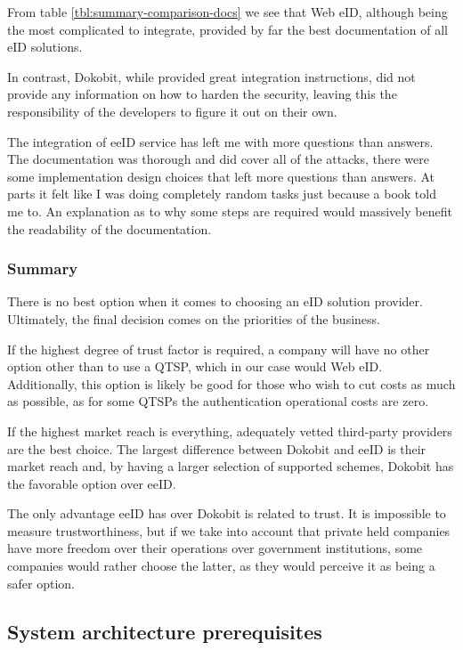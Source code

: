 From table \ref{tbl:summary-comparison-docs} we see that Web eID, although being the most complicated to integrate, provided by far the best documentation of all eID solutions.

In contrast, Dokobit, while provided great integration instructions, did not provide any information on how to harden the security, leaving this the responsibility of the developers to figure it out on their own.

The integration of eeID service has left me with more questions than answers. The documentation was thorough and did cover all of the attacks, there were some implementation design choices that left more questions than answers. At parts it felt like I was doing completely random tasks just because a book told me to. An explanation as to why some steps are required would massively benefit the readability of the documentation.

\subsubsection{Summary}

There is no best option when it comes to choosing an eID solution provider. Ultimately, the final decision comes on the priorities of the business.

If the highest degree of trust factor is required, a company will have no other option other than to use a QTSP, which in our case would Web eID. Additionally, this option is likely be good for those who wish to cut costs as much as possible, as for some QTSPs the authentication operational costs are zero.

If the highest market reach is everything, adequately vetted third-party providers are the best choice. The largest difference between Dokobit and eeID is their market reach and, by having a larger selection of supported schemes, Dokobit has the favorable option over eeID.

The only advantage eeID has over Dokobit is related to trust. It is impossible to measure trustworthiness, but if we take into account that private held companies have more freedom over their operations over government institutions, some companies would rather choose the latter, as they would perceive it as being a safer option.

\subsection{System architecture prerequisites}

